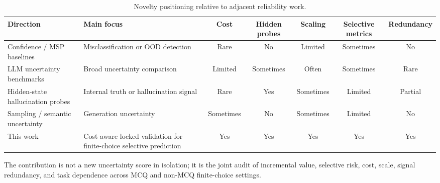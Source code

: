 \begin{table}[t]
\centering
\small
\caption{Novelty positioning relative to adjacent reliability work.}
\label{tab:novelty}
\begin{threeparttable}

\begin{adjustbox}{width=\textwidth}
\begin{tabular}{p{}p{}ccccc}
\toprule
Direction & Main focus & Cost & Hidden probes & Scaling & Selective metrics & Redundancy \\
\midrule
Confidence / MSP baselines & Misclassification or OOD detection & Rare & No & Limited & Sometimes & No \\
LLM uncertainty benchmarks & Broad uncertainty comparison & Limited & Sometimes & Often & Sometimes & Rare \\
Hidden-state hallucination probes & Internal truth or hallucination signal & Rare & Yes & Sometimes & Limited & Partial \\
Sampling / semantic uncertainty & Generation uncertainty & Sometimes & No & Sometimes & Limited & No \\
This work & Cost-aware locked validation for finite-choice selective prediction & Yes & Yes & Yes & Yes & Yes \\
\bottomrule
\end{tabular}
\end{adjustbox}

\begin{tablenotes}[flushleft]\footnotesize\item \parbox{0.95\textwidth}{The contribution is not a new uncertainty score in isolation; it is the joint audit of incremental value, selective risk, cost, scale, signal redundancy, and task dependence across MCQ and non-MCQ finite-choice settings.}\end{tablenotes}
\end{threeparttable}
\end{table}
